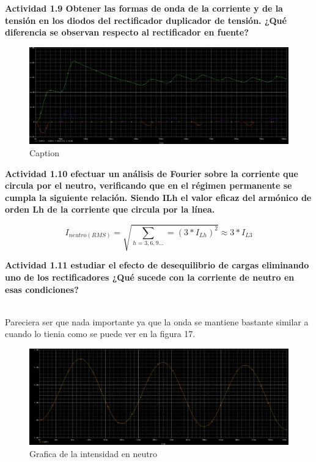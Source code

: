 \documentclass[letterpaper]{article}
\begin{document}
 \begin{large}

\textbf{Actividad 1.9 Obtener las formas de onda de la corriente y de la tensión
en los diodos del rectificador duplicador de tensión. ¿Qué diferencia
se observan respecto al rectificador en fuente? }\end{large}
 \begin{large}
 \begin{figure}[htb]
     \centering
     \includegraphics[scale=0.3]{ondacdup.png}
     \caption{Caption}
     \label{fig:my_label}
 \end{figure}

\textbf{Actividad 1.10 efectuar un análisis de Fourier sobre la corriente
que circula por el neutro, verificando que en el régimen permanente
se cumpla la siguiente relación. Siendo ILh el valor eficaz del armónico
de orden Lh de la corriente que circula por la línea.}\end{large} 
 \begin{large}
\[
I_{neutro(RMS)}=\sqrt{\sum_{h=3,6,9...}=(3*I_{Lh})^{2}}\approx3*I_{L3}
\]\end{large}
 \begin{large}

\textbf{Actividad 1.11 estudiar el efecto de desequilibrio de cargas eliminando
uno de los rectificadores ¿Qué sucede con la corriente de neutro en
esas condiciones?} \end{large}\\
Pareciera ser que nada importante ya que la onda se mantiene bastante similar a cuando lo tienia como se puede ver en la figura 17.\\
\begin{figure}[htb]
    \centering
    \includegraphics[scale=0.3]{intneu.png}
    \caption{Grafica de la intensidad en neutro}
    \label{fig:my_la45l}
\end{figure}
\end{document}

